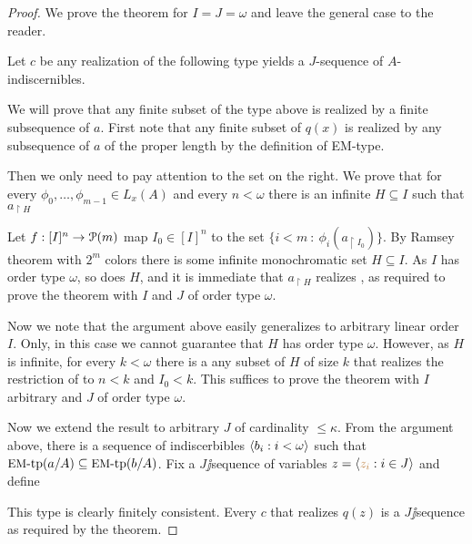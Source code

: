 \documentclass[creche.tex]{subfiles}
\begin{document}
\begin{proof}
  We prove the theorem for $I=J=\omega$ and leave the general case to the reader. 
  
  Let $c$ be any realization of the following type yields a $J$-sequence of $A$-indiscernibles.


  We will prove that any finite subset of the type above is realized by a finite subsequence of $a$. First note that any finite subset of $q(x)$ is realized by any subsequence of $a$ of the proper length by the definition of EM-type.
  
  Then we only need to pay attention to the set on the right. We prove that for every $\phi_0,\dots,\phi_{m-1}\in L_x(A)$ and every $n<\omega$ there is an infinite $H\subseteq I$ such that $a_{\restriction H}$


  Let $f:[I]^n\to\P(m)$ map $I_0\in[I]^n$ to the set $\big\{i<m\ :\ \phi_i(a_{\restriction I_0})\big\}$. By Ramsey theorem with $2^m$ colors there is some infinite monochromatic set $H\subseteq I$. As $I$ has order type $\omega$, so does $H$, and it is immediate that $a_{\restriction H}$ realizes \ssf{\#}, as required to prove the theorem with $I$ and $J$ of order type $\omega$.

  Now we note that the argument above easily generalizes to arbitrary linear order $I$. Only, in this case we cannot guarantee that $H$ has order type $\omega$. However, as $H$ is infinite, for every $k<\omega$ there is a any subset of $H$ of size $k$ that realizes the restriction of \ssf{\#} to $n<k$ and $I_0<k$. This suffices to prove the theorem with $I$ arbitrary and $J$ of order type $\omega$.
  
  Now we extend the result to arbitrary $J$ of cardinality $\le\kappa$. From the argument above, there is a sequence of indiscerbibles $\<b_i:i<\omega\>$ such that $\EMtp(a/A)\subseteq\EMtp(b/A)$. Fix a $J\jj$sequence of variables $z=\<{\mr z_i}:i\in J\>$ and define

  
  This type is clearly finitely consistent. Every $c$ that realizes $q(z)$ is a $J\jj$sequence as required by the theorem. 
  \end{proof}
\end{document}
